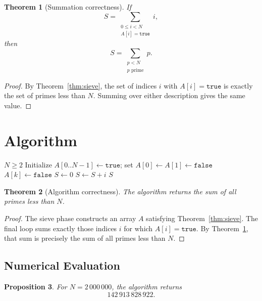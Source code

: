 \documentclass[11pt]{article}
\newtheorem{theorem}{Theorem}
\newtheorem{proposition}[theorem]{Proposition}
\begin{document}
\begin{theorem}[Summation correctness]\label{thm:sum}
If
\[
S = \sum_{\substack{0 \le i < N \\ A[i] = \texttt{true}}} i,
\]
then
\[
S = \sum_{\substack{p < N \\ p \text{ prime}}} p.
\]
\end{theorem}

\begin{proof}
By Theorem~\ref{thm:sieve}, the set of indices $i$ with $A[i] = \texttt{true}$ is exactly the set of primes less than $N$. Summing over either description gives the same value.
\end{proof}

\section{Algorithm}

\begin{algorithm}[H]
\caption{Sum of all primes below $N$}
\begin{algorithmic}[1]
\REQUIRE $N \ge 2$
\STATE Initialize $A[0..N{-}1] \gets \texttt{true}$; set $A[0] \gets A[1] \gets \texttt{false}$
            \STATE $A[k] \gets \texttt{false}$
        \ENDFOR
    \ENDIF
\ENDFOR
\STATE $S \gets 0$
        \STATE $S \gets S + i$
    \ENDIF
\ENDFOR
\RETURN $S$
\end{algorithmic}
\end{algorithm}

\begin{theorem}[Algorithm correctness]
The algorithm returns the sum of all primes less than $N$.
\end{theorem}

\begin{proof}
The sieve phase constructs an array $A$ satisfying Theorem~\ref{thm:sieve}. The final loop sums exactly those indices $i$ for which $A[i] = \texttt{true}$. By Theorem~\ref{thm:sum}, that sum is precisely the sum of all primes less than $N$.
\end{proof}

\subsection*{Numerical Evaluation}

\begin{proposition}
For $N = 2\,000\,000$, the algorithm returns
\[
142\,913\,828\,922.
\]
\end{proposition}
\end{document}
